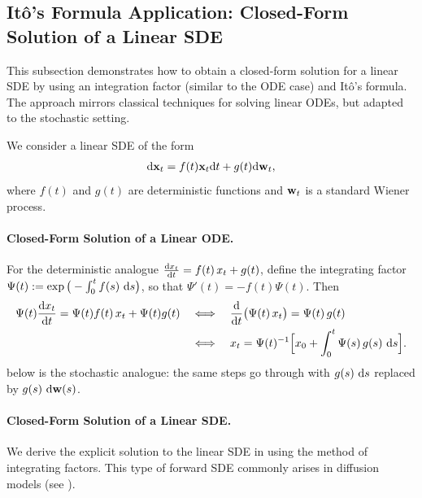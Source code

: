 \subsection{It\^o's Formula Application: Closed-Form Solution of a Linear SDE}\label{subsec:rigorous-proof-linear-sde}
This subsection demonstrates how to obtain a closed-form solution for a linear SDE by using an integration factor (similar to the ODE case) and It\^o's formula. The approach mirrors classical techniques for solving linear ODEs, but adapted to the stochastic setting.

We consider a linear SDE of the form
\begin{align}\label{eq:app-linear-sde}
    \mathrm{d}{\mathbf{x}}_t = f(t){\mathbf{x}}_t \mathrm{d}t + g(t) \mathrm{d}{\mathbf{w}}_t,
\end{align}
where $f(t)$ and $g(t)$ are deterministic functions and ${\mathbf{w}}_t$ is a standard Wiener process. 
\begingroup\color{notesblue}%
\paragraph{Closed-Form Solution of a Linear ODE.} For the deterministic analogue $\frac{\mathop{}\!\mathrm{d} x_t}{\mathop{}\!\mathrm{d} t} = f(t)\,x_t + g(t)$, define the integrating factor $\Psi(t) := \exp\big(-\int_0^t f(s)\,\mathop{}\!\mathrm{d} s\big)$, so that $\Psi'(t) = -f(t)\Psi(t)$. Then
\begin{align*}
\Psi(t)\frac{\mathop{}\!\mathrm{d} x_t}{\mathop{}\!\mathrm{d} t} = \Psi(t)f(t)\,x_t + \Psi(t)g(t)
\quad&\Longleftrightarrow\quad
\frac{\mathop{}\!\mathrm{d}}{\mathop{}\!\mathrm{d} t}\big(\Psi(t)\,x_t\big) = \Psi(t)\,g(t) \\
&\Longleftrightarrow\quad
x_t = \Psi(t)^{-1}\Big[ x_0 + \int_0^t \Psi(s)\,g(s)\,\mathop{}\!\mathrm{d} s \Big].
\end{align*}
 below is the stochastic analogue: the same steps go through with $g(s)\,\mathop{}\!\mathrm{d} s$ replaced by $g(s)\,\mathop{}\!\mathrm{d}{\mathbf{w}}(s)$.
\endgroup
\paragraph{Closed-Form Solution of a Linear SDE.} We derive the explicit solution to the linear SDE in  using the method of integrating factors. This type of forward SDE commonly arises in diffusion models (see ).


